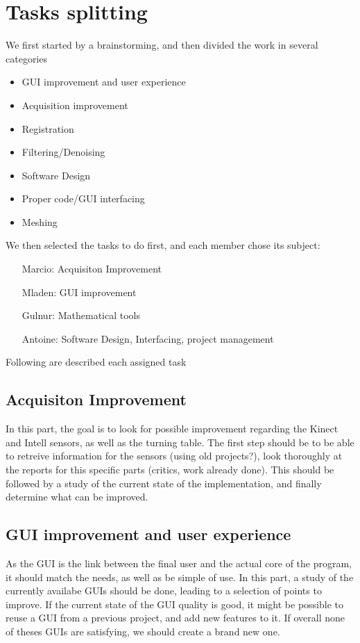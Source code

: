 \documentclass[aps,letterpaper,11pt]{revtex4}
\begin{document}
\section{Tasks splitting}
We first started by a brainstorming, and then divided the work in several categories

\begin{itemize}
\item GUI improvement and user experience
\item Acquisition improvement
\item Registration
\item Filtering/Denoising
\item Software Design
\item Proper code/GUI interfacing
\item Meshing
\end{itemize}

We then selected the tasks to do first, and each member chose its subject:

\begin{itemize}
\item[Marcio:] Acquisiton Improvement
\item[Mladen:] GUI improvement
\item[Gulnur:] Mathematical tools
\item[Antoine:] Software Design, Interfacing, project management
\end{itemize}

Following are described each assigned task

\subsection{Acquisiton Improvement}

In this part, the goal is to look for possible improvement regarding the Kinect and Intell sensors, as well as the turning table.
The first step should be to be able to retreive information for the sensors (using old projects?), look thoroughly at the reports for this specific parts (critics, work already done). This should be followed by a study of the current state of the implementation, and finally determine what can be improved.

\subsection{GUI improvement and user experience}

As the GUI is the link between the final user and the actual core of the program, it should match the needs, as well as be simple of use. In this part, a study of the currently availabe GUIs should be done, leading to a selection of points to improve. If the current state of the GUI quality is good, it might be possible to reuse a GUI from a previous project, and add new features to it. If overall none of theses GUIs are satisfying, we should create a brand new one.
\end{document}
